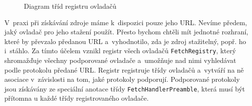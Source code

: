 \begin{figure}[H]
  \begin{center}
    \caption{Diagram tříd registru ovladačů}
    \label{Figure.FetchRegistry}
  \end{center}
\end{figure}

V~praxi při získávání zdroje máme k~dispozici pouze jeho URL. Nevíme předem, jaký ovladač pro jeho stažení použít. Přesto bychom chtěli mít jednotné rozhraní, které by převzalo předanou URL a~vyhodnotilo, zda je zdroj stažitelný, popř. ho i~stáhlo. Za tímto účelem vznikl registr všech ovladačů \texttt{FetchRegistry}, který shromažďuje všechny podporované ovladače a~umožňuje nad nimi vyhledávat podle protokolu předané URL. Registr registruje třídy ovladačů a~vytváří na ně asociace v~závislosti na tom, jaké protokoly podporují. Podporované protokoly jsou získávány ze speciální anotace třídy \texttt{FetchHandlerPreamble}, která musí být přítomna u každé třídy registrovaného ovladače.

